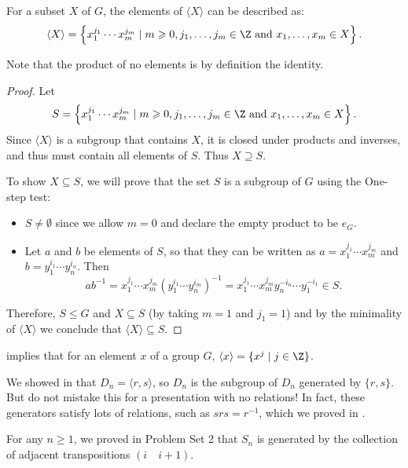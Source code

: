 \begin{lemma}\label{lem:<X>}
For a subset $X$ of $G$, the elements of $\langle X \rangle$ can be described as:
$$\langle X \rangle = \left\{x_1^{j_1} \cdots x_m^{j_m} \mid m \geqslant 0, j_1, \dots, j_m \in \Z \text{ and }x_1, \dots, x_m \in X \right\}.$$
\end{lemma}

Note that the product of no elements is by definition the identity.

\begin{proof} 
Let 
$$S= \left\{x_1^{j_1} \cdots x_m^{j_m} \mid m \geqslant 0, j_1, \dots, j_m \in \Z \text{ and }x_1, \dots, x_m \in X \right\}.$$ 
Since $\langle X \rangle$ is a subgroup that contains $X$, it is closed under products and inverses, and thus must contain all elements of $S$. Thus $X \supseteq S$.

To show $X \subseteq S$, we will prove that the set $S$ is a subgroup of $G$ using the One-step test:
\begin{itemize}
\item $S \neq \emptyset$ since we allow $m = 0$ and
declare the empty product to be $e_G$. 
\item Let $a$ and $b$ be elements of $S$, so that they can be written as
$a = x_1^{j_1} \cdots x_m^{j_m}$ and $b= y_1^{i_1} \cdots y_n^{i_n}$. Then
$$
ab^{-1} = x_1^{j_1} \cdots x_m^{j_m}(y_1^{i_1} \cdots y_n^{i_m})^{-1}=
x_1^{j_1} \cdots x_m^{j_m} y_n^{-i_n} \cdots y_1^{-i_1} \in S.
$$
\end{itemize}
Therefore, $S\leq G$ and $X\subseteq S$ (by taking $m=1$ and $j_1=1$) and by the minimality of $\langle X \rangle$ we conclude that $\langle X \rangle\subseteq S$. 
\end{proof}

 
 \begin{example} 
 implies that for an element $x$ of a group $G$, $\langle x\rangle=\{x^j \mid j\in \Z\}$.
\end{example}

\begin{example} 
We showed in  that $D_{n}=\langle r,s \rangle$, so $D_{n}$ is the subgroup of $D_{n}$ generated by $\{r,s\}$. But do not mistake this for a presentation with no relations! In fact, these generators satisfy lots of relations, such as $srs=r^{-1}$, which we proved in .
\end{example}

\begin{example} 
For any $n \geqslant 1$, we proved in Problem Set 2 that $S_n$ is generated by the collection of adjacent transpositions $(i \quad i+1)$.	
\end{example}



